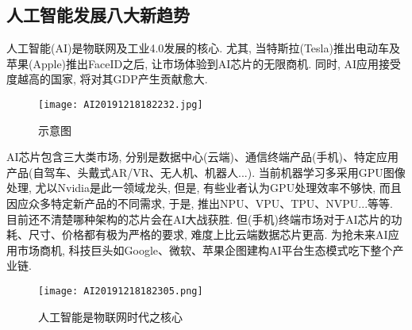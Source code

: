 \subsection{人工智能发展八大新趋势}
人工智能(AI)是物联网及工业4.0发展的核心. 尤其, 当特斯拉(Tesla)推出电动车及苹果(Apple)推出FaceID之后, 让市场体验到AI芯片的无限商机. 同时, AI应用接受度越高的国家, 将对其GDP产生贡献愈大.
\begin{figure}[htbp]
	\centering
	\texttt{[image: AI20191218182232.jpg]}
	\caption{示意图}
   \label{AI20191218182232Fig4}
\end{figure}
AI芯片包含三大类市场, 分别是数据中心(云端)、通信终端产品(手机)、特定应用产品(自驾车、头戴式AR/VR、无人机、机器人...). 当前机器学习多采用GPU图像处理, 尤以Nvidia是此一领域龙头, 但是, 有些业者认为GPU处理效率不够快, 而且因应众多特定新产品的不同需求, 于是, 推出NPU、VPU、TPU、NVPU...等等. 目前还不清楚哪种架构的芯片会在AI大战获胜. 但(手机)终端市场对于AI芯片的功耗、尺寸、价格都有极为严格的要求, 难度上比云端数据芯片更高. 为抢未来AI应用市场商机, 科技巨头如Google、微软、苹果企图建构AI平台生态模式吃下整个产业链.
\begin{figure}[htbp]
	\centering
	\texttt{[image: AI20191218182305.png]}
	\caption{人工智能是物联网时代之核心}
   \label{AI20191218182305Fig4}
\end{figure}

